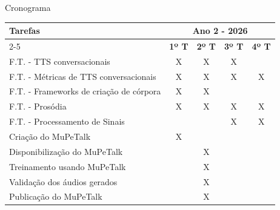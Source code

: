 \begin{frame}{Cronograma}
  \tiny
  \begin{table}[]
    \begin{tabular}{|l|cccc|}
      \hline
      \multirow{2}{*}{\textbf{Tarefas}}
      & \multicolumn{4}{c|}{\textbf{Ano 2 - 2026}}
      \\ \cline{2-5}
      & \multicolumn{1}{c|}{\textbf{1º T}}  & \multicolumn{1}{c|}{\textbf{2º T}}  &
      \multicolumn{1}{c|}{\textbf{3º T}} & \multicolumn{1}{c|}{\textbf{4º T}} \\ \hline
      F.T. - TTS conversacionais
      & \multicolumn{1}{c|}{X}              & \multicolumn{1}{c|}{X}              &
      \multicolumn{1}{c|}{X}             & \multicolumn{1}{c|}{}              \\ \hline
      F.T. - Métricas de TTS conversacionais
      & \multicolumn{1}{c|}{X}              & \multicolumn{1}{c|}{X}              &
      \multicolumn{1}{c|}{X}             & \multicolumn{1}{c|}{X}             \\ \hline
      F.T. - Frameworks de criação de córpora
      & \multicolumn{1}{c|}{X}              & \multicolumn{1}{c|}{X}              &
      \multicolumn{1}{c|}{}              & \multicolumn{1}{c|}{}              \\ \hline
      F.T. - Prosódia
      & \multicolumn{1}{c|}{X}              & \multicolumn{1}{c|}{X}              &
      \multicolumn{1}{c|}{X}             & \multicolumn{1}{c|}{X}             \\ \hline
      F.T. - Processamento de Sinais
      & \multicolumn{1}{c|}{}               & \multicolumn{1}{c|}{}               &
      \multicolumn{1}{c|}{X}             & \multicolumn{1}{c|}{X}             \\ \hline
      Criação do MuPeTalk
      & \multicolumn{1}{c|}{X}              & \multicolumn{1}{c|}{}               &
      \multicolumn{1}{c|}{}              & \multicolumn{1}{c|}{}              \\ \hline
      Disponibilização do MuPeTalk
      & \multicolumn{1}{c|}{}               & \multicolumn{1}{c|}{X}              &
      \multicolumn{1}{c|}{}              & \multicolumn{1}{c|}{}              \\ \hline
      Treinamento usando MuPeTalk
      & \multicolumn{1}{c|}{}               & \multicolumn{1}{c|}{X}              &
      \multicolumn{1}{c|}{}              & \multicolumn{1}{c|}{}              \\ \hline
      Validação dos áudios gerados
      & \multicolumn{1}{c|}{}               & \multicolumn{1}{c|}{X}              &
      \multicolumn{1}{c|}{}              & \multicolumn{1}{c|}{}              \\ \hline
      Publicação do MuPeTalk
      & \multicolumn{1}{c|}{}               & \multicolumn{1}{c|}{X}              &
      \multicolumn{1}{c|}{}              & \multicolumn{1}{c|}{}              \\ \hline
    \end{tabular}
  \end{table}
\end{frame}

